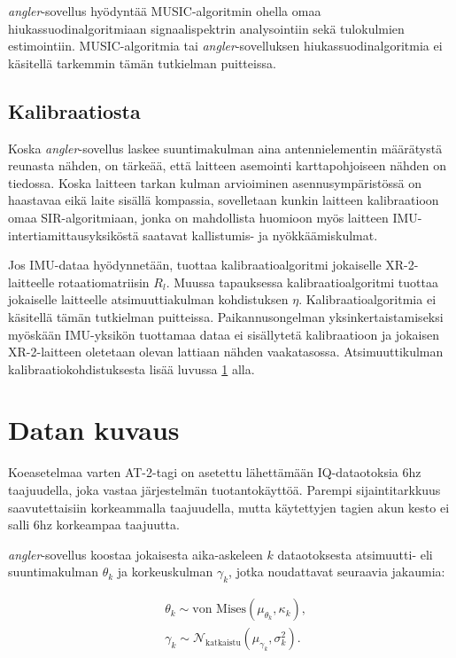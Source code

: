 \documentclass[
  12pt,
  a4paper, twoside]{book}
\begin{document}
\emph{angler}-sovellus hyödyntää MUSIC-algoritmin ohella omaa hiukassuodinalgoritmiaan signaalispektrin analysointiin sekä tulokulmien estimointiin. MUSIC-algoritmia tai \emph{angler}-sovelluksen hiukassuodinalgoritmia ei käsitellä tarkemmin tämän tutkielman puitteissa.

\subsection{Kalibraatiosta}

Koska \emph{angler}-sovellus laskee suuntimakulman aina antennielementin määrätystä reunasta nähden, on tärkeää, että laitteen asemointi karttapohjoiseen nähden on tiedossa. Koska laitteen tarkan kulman arvioiminen asennusympäristössä on haastavaa eikä laite sisällä kompassia, sovelletaan kunkin laitteen kalibraatioon omaa SIR-algoritmiaan, jonka on mahdollista huomioon myös laitteen IMU-intertiamittausyksiköstä saatavat kallistumis- ja nyökkäämiskulmat.

Jos IMU-dataa hyödynnetään, tuottaa kalibraatioalgoritmi jokaiselle XR-2-laitteelle rotaatiomatriisin \(R_l\). Muussa tapauksessa kalibraatioalgoritmi tuottaa jokaiselle laitteelle atsimuuttiakulman kohdistuksen \(\eta\). Kalibraatioalgoritmia ei käsitellä tämän tutkielman puitteissa. Paikannusongelman yksinkertaistamiseksi myöskään IMU-yksikön tuottamaa dataa ei sisällytetä kalibraatioon ja jokaisen XR-2-laitteen oletetaan olevan lattiaan nähden vaakatasossa. Atsimuuttikulman kalibraatiokohdistuksesta lisää luvussa \ref{datan-kuvaus} alla.

\section{Datan kuvaus} \label{datan-kuvaus}

Koeasetelmaa varten AT-2-tagi on asetettu lähettämään IQ-dataotoksia 6hz taajuudella, joka vastaa järjestelmän tuotantokäyttöä. Parempi sijaintitarkkuus saavutettaisiin korkeammalla taajuudella, mutta käytettyjen tagien akun kesto ei salli 6hz korkeampaa taajuutta.

\emph{angler}-sovellus koostaa jokaisesta aika-askeleen \(k\) dataotoksesta atsimuutti- eli suuntimakulman \(\theta_k\) ja korkeuskulman \(\gamma_k\), jotka noudattavat seuraavia jakaumia:

\begin{align}
&\theta_{k} \sim \text{von Mises}(\mu_{\theta_k}, \kappa_k),\\
&\gamma_{k} \sim \mathcal{N}_{\text{katkaistu}} (\mu_{\gamma_k}, \sigma^2_k).
\end{align}
\end{document}
